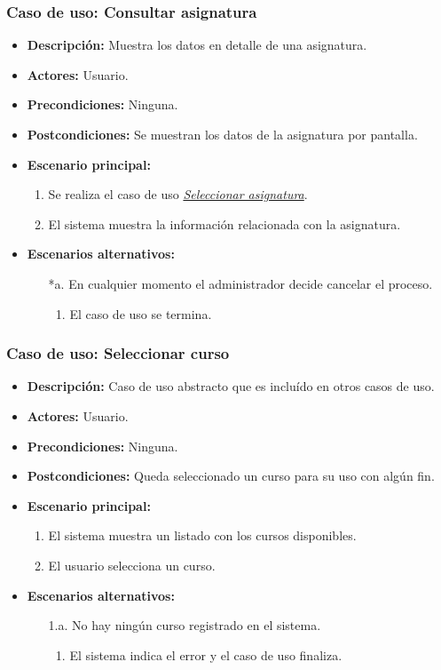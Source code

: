 \documentclass{book}
\begin{document}
\subsubsection*{Caso de uso: Consultar asignatura}
\begin{itemize}
\item{\bf Descripción:} Muestra los datos en detalle de una asignatura.
\item{\bf Actores:} Usuario.
\item{\bf Precondiciones:} Ninguna.
\item{\bf Postcondiciones:} Se muestran los datos de la asignatura por pantalla.
\item{\bf Escenario principal:} 
	\begin{enumerate}
	\item Se realiza el caso de uso {\em \hyperref[select_asignatura]{Seleccionar asignatura}}.
	\item El sistema muestra la información relacionada con la asignatura.
	\end{enumerate}
\item{\bf Escenarios alternativos:}
	\begin{itemize}
	\item[*a.] En cualquier momento el administrador decide cancelar el proceso.
		\begin{enumerate}
		\item El caso de uso se termina.
		\end{enumerate}
	\end{itemize}
\end{itemize}

\pagebreak

\subsubsection*{Caso de uso: Seleccionar curso}
\begin{itemize}
\item{\bf Descripción:} Caso de uso abstracto que es incluído en otros casos de uso.
\item{\bf Actores:} Usuario.
\item{\bf Precondiciones:} Ninguna.
\item{\bf Postcondiciones:} Queda seleccionado un curso para su uso con algún fin.
\item{\bf Escenario principal:}
	\begin{enumerate}
	\item El sistema muestra un listado con los cursos disponibles.
        \item El usuario selecciona un curso.
	\end{enumerate}
\item{\bf Escenarios alternativos:}
	\begin{itemize}
	\item[1.a.]No hay ningún curso registrado en el sistema.
	  \begin{enumerate}
	  \item El sistema indica el error y el caso de uso finaliza.
	  \end{enumerate}
	\end{itemize}
\end{itemize}
\end{document}
